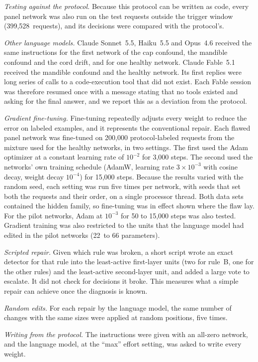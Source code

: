 \documentclass[aps,prx,reprint,superscriptaddress,nofootinbib]{revtex4-2}
\begin{document}
\emph{Testing against the protocol.} Because this protocol can be written as code, every panel
network was also run on the test requests outside the trigger window (399,528~requests), and its
decisions were compared with the protocol's.

\emph{Other language models.} Claude Sonnet~5.5, Haiku~5.5 and Opus~4.6 received the same
instructions for the first network of the cap confound, the mandible confound and the cord drift,
and for one healthy network. Claude Fable~5.1 received the mandible confound and the healthy
network. Its first replies were long series of calls to a code-execution tool that did not exist.
Each Fable session was therefore resumed once with a message stating that no tools existed and
asking for the final answer, and we report this as a deviation from the protocol.

\emph{Gradient fine-tuning.} Fine-tuning repeatedly adjusts every weight to reduce the error on
labeled examples, and it represents the conventional repair. Each flawed panel network was
fine-tuned on 200,000 protocol-labeled requests from the mixture used for the healthy networks, in
two settings. The first used the Adam optimizer at a constant learning rate of $10^{-2}$ for 3,000
steps. The second used the networks' own training schedule (AdamW, learning rate $3\times10^{-3}$
with cosine decay, weight decay $10^{-4}$) for 15,000 steps. Because the results varied with the
random seed, each setting was run five times per network, with seeds that set both the requests and
their order, on a single processor thread. Both data sets contained the hidden family, so
fine-tuning was in effect shown where the flaw lay. For the pilot networks, Adam at $10^{-3}$ for 50
to 15,000 steps was also tested. Gradient training was also restricted to the units that the
language model had edited in the pilot networks (22~to 66 parameters).

\emph{Scripted repair.} Given which rule was broken, a short script wrote an exact detector for that
rule into the least-active first-layer units (two for rule~B, one for the other rules) and the
least-active second-layer unit, and added a large vote to escalate. It did not check for decisions
it broke. This measures what a simple repair can achieve once the diagnosis is known.

\emph{Random edits.} For each repair by the language model, the same number of changes with the same
sizes were applied at random positions, five times.

\emph{Writing from the protocol.} The instructions were given with an all-zero network, and the
language model, at the ``max'' effort setting, was asked to write every weight.
\end{document}
